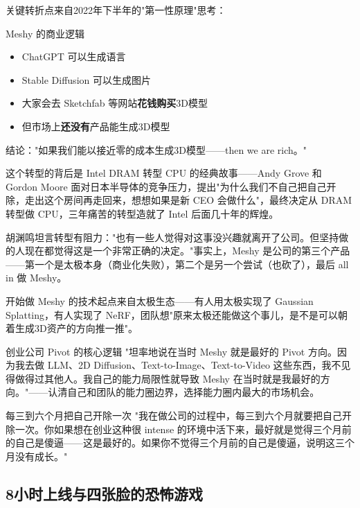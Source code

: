 关键转折点来自2022年下半年的"第一性原理"思考：

\begin{importantbox}{Meshy 的商业逻辑}
\begin{itemize}
\item ChatGPT 可以生成语言
\item Stable Diffusion 可以生成图片
\item 大家会去 Sketchfab 等网站\textbf{花钱购买}3D模型
\item 但市场上\textbf{还没有}产品能生成3D模型
\end{itemize}
结论："如果我们能以接近零的成本生成3D模型——then we are rich。"
\end{importantbox}

这个转型的背后是 Intel DRAM 转型 CPU 的经典故事——Andy Grove 和 Gordon Moore 面对日本半导体的竞争压力，提出"为什么我们不自己把自己开除，走出这个房间再走回来，想想如果是新 CEO 会做什么"，最终决定从 DRAM 转型做 CPU，三年痛苦的转型造就了 Intel 后面几十年的辉煌。

胡渊鸣坦言转型有阻力："也有一些人觉得对这事没兴趣就离开了公司。但坚持做的人现在都觉得这是一个非常正确的决定。"事实上，Meshy 是公司的第三个产品——第一个是太极本身（商业化失败），第二个是另一个尝试（也砍了），最后 all in 做 Meshy。

开始做 Meshy 的技术起点来自太极生态——有人用太极实现了 Gaussian Splatting，有人实现了 NeRF，团队想"原来太极还能做这个事儿，是不是可以朝着生成3D资产的方向推一推"。

\begin{importantbox}{创业公司 Pivot 的核心逻辑}
"坦率地说在当时 Meshy 就是最好的 Pivot 方向。因为我去做 LLM、2D Diffusion、Text-to-Image、Text-to-Video 这些东西，我不见得做得过其他人。我自己的能力局限性就导致 Meshy 在当时就是我最好的方向。"——认清自己和团队的能力圈边界，选择能力圈内最大的市场机会。
\end{importantbox}

\begin{importantbox}{每三到六个月把自己开除一次}
"我在做公司的过程中，每三到六个月就要把自己开除一次。你如果想在创业这种很 intense 的环境中活下来，最好就是觉得三个月前的自己是傻逼——这是最好的。如果你不觉得三个月前的自己是傻逼，说明这三个月没有成长。"
\end{importantbox}

\subsection{8小时上线与四张脸的恐怖游戏}

